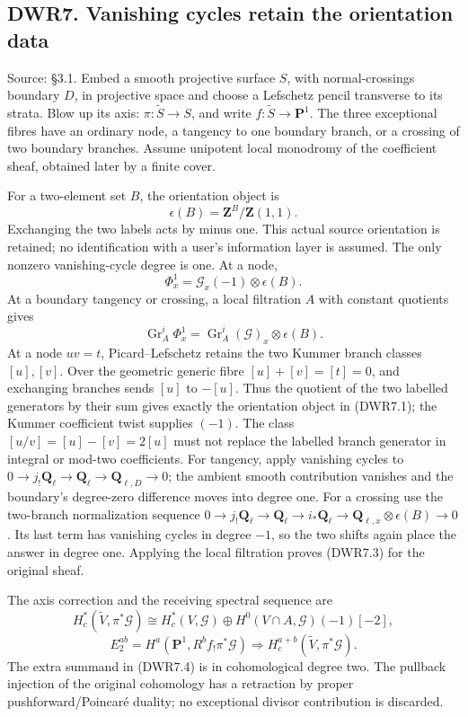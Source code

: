 \subsection{DWR7. Vanishing cycles retain the orientation
data}\label{dwr7.-vanishing-cycles-retain-the-orientation-data}

Source: §3.1. Embed a smooth projective surface \(S\), with
normal-crossings boundary \(D\), in projective space and choose a
Lefschetz pencil transverse to its strata. Blow up its axis:
\(\pi:\widetilde S\to S\), and write \(f:\widetilde S\to\mathbf P^1\).
The three exceptional fibres have an ordinary node, a tangency to one
boundary branch, or a crossing of two boundary branches. Assume
unipotent local monodromy of the coefficient sheaf, obtained later by a
finite cover.

For a two-element set \(B\), the orientation object is \[
\epsilon(B)=\mathbf Z^B/\mathbf Z(1,1).
\tag{DWR7.1}
\] Exchanging the two labels acts by minus one. This actual source
orientation is retained; no identification with a user's information
layer is assumed. The only nonzero vanishing-cycle degree is one. At a
node, \[
\Phi_x^1=\mathcal G_x(-1)\otimes\epsilon(B).
\tag{DWR7.2}
\] At a boundary tangency or crossing, a local filtration \(A\) with
constant quotients gives \[
\operatorname{Gr}_A^i\Phi_x^1
=\operatorname{Gr}_A^i(\mathcal G)_x\otimes\epsilon(B).
\tag{DWR7.3}
\] At a node \(uv=t\), Picard--Lefschetz retains the two Kummer branch
classes \([u],[v]\). Over the geometric generic fibre \([u]+[v]=[t]=0\),
and exchanging branches sends \([u]\) to \(-[u]\). Thus the quotient of
the two labelled generators by their sum gives exactly the orientation
object in (DWR7.1); the Kummer coefficient twist supplies \((-1)\). The
class \([u/v]=[u]-[v]=2[u]\) must not replace the labelled branch
generator in integral or mod-two coefficients. For tangency, apply
vanishing cycles to
\(0\to j_!\mathbf Q_\ell\to\mathbf Q_\ell\to\mathbf Q_{\ell,D}\to0\);
the ambient smooth contribution vanishes and the boundary's degree-zero
difference moves into degree one. For a crossing use the two-branch
normalization sequence
\(0\to j_!\mathbf Q_\ell\to\mathbf Q_\ell\to i_*\mathbf Q_\ell\to\mathbf Q_{\ell,x}\otimes\epsilon(B)\to0\).
Its last term has vanishing cycles in degree \(-1\), so the two shifts
again place the answer in degree one. Applying the local filtration
proves (DWR7.3) for the original sheaf.

The axis correction and the receiving spectral sequence are \[
H_c^*(\widetilde V,\pi^*\mathcal G)
\cong H_c^*(V,\mathcal G)\oplus
H^0(V\cap A,\mathcal G)(-1)[-2],
\tag{DWR7.4}
\] \[
E_2^{ab}=H^a(\mathbf P^1,R^bf_!\pi^*\mathcal G)
\Longrightarrow H_c^{a+b}(\widetilde V,\pi^*\mathcal G).
\tag{DWR7.5}
\] The extra summand in (DWR7.4) is in cohomological degree two. The
pullback injection of the original cohomology has a retraction by proper
pushforward/Poincaré duality; no exceptional divisor contribution is
discarded.

